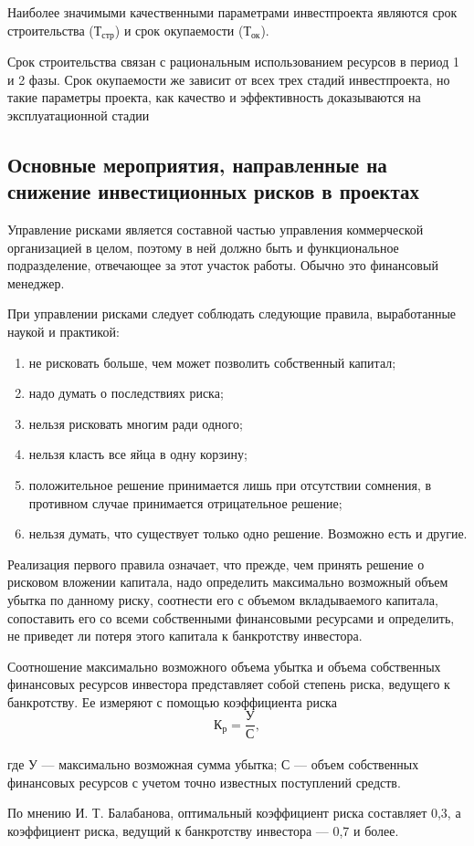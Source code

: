 Наиболее значимыми качественными параметрами инвестпроекта являются срок строительства ($\text{Т}_{\text{стр}}$) и срок окупаемости ($\text{Т}_{\text{ок}}$).

Срок строительства связан с рациональным использованием ресурсов в период 1 и 2 фазы. Срок окупаемости же зависит от всех трех стадий инвестпроекта, но такие параметры проекта, как качество и эффективность доказываются на эксплуатационной стадии \cite[с. 162--166]{sergeev}

\subsection{Основные мероприятия, направленные на снижение инвестиционных рисков в проектах}

Управление рисками является составной частью управления коммерческой организацией в целом, поэтому в ней должно быть и функциональное подразделение, отвечающее за этот участок работы.
Обычно это финансовый менеджер.

При управлении рисками следует соблюдать следующие правила, выработанные наукой и практикой:
\begin{enumerate}
	\setlength\itemsep{0pt}
	\item не рисковать больше, чем может позволить собственный капитал;
	\item надо думать о последствиях риска;
	\item нельзя рисковать многим ради одного;
	\item нельзя класть все яйца в одну корзину;
	\item положительное решение принимается лишь при отсутствии сомнения, в противном случае принимается отрицательное решение;
	\item нельзя думать, что существует только одно решение. Возможно есть и другие.
\end{enumerate}

Реализация первого правила означает, что прежде, чем принять решение о рисковом вложении капитала, надо определить максимально возможный объем убытка по данному риску, соотнести его с объемом вкладываемого капитала, сопоставить его со всеми собственными финансовыми ресурсами и определить, не приведет ли потеря этого капитала к банкротству инвестора.

Соотношение максимально возможного объема убытка и объема собственных финансовых ресурсов инвестора представляет собой степень риска, ведущего к банкротству.
Ее измеряют с помощью коэффициента риска
\[ \text{К}_\text{р} = \frac{\text{У}}{\text{С}}, \]\\
где У --- максимально возможная сумма убытка; С --- объем собственных финансовых ресурсов с учетом точно известных поступлений средств.

По мнению И. Т. Балабанова, оптимальный коэффициент риска составляет 0,3, а коэффициент риска, ведущий к банкротству инвестора --- 0,7 и более.

